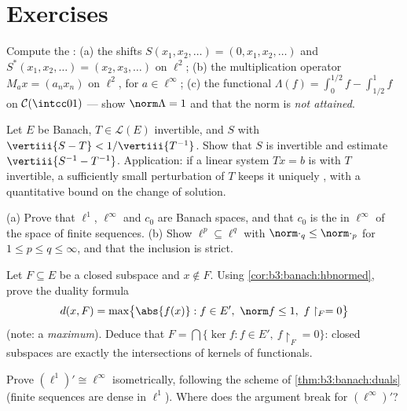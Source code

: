 \section{Exercises}

\begin{exercise}[$\star$]\label{exo:b3:banach:1}
Compute the :
(a) the shifts $S(x_1, x_2, \dots) = (0, x_1, x_2, \dots)$ and
$S^*(x_1, x_2, \dots) = (x_2, x_3, \dots)$ on $\ell^2$;
(b) the multiplication operator $M_a x = (a_nx_n)$ on $\ell^2$,
for $a \in \ell^\infty$;
(c) the functional $\Lambda(f) = \int_0^{1/2}f -
\int_{1/2}^1f$ on $\mathcal C(\intcc01)$ --- show
$\norm\Lambda = 1$ and that the norm is \emph{not attained}.
\end{exercise}

\begin{exercise}[$\star$]\label{exo:b3:banach:2}
Let $E$ be Banach, $T \in \mathcal L(E)$ invertible, and $S$
with $\vertiii{S - T} < 1/\vertiii{T^{-1}}$. Show that $S$ is
invertible and estimate $\vertiii{S^{-1} - T^{-1}}$. Application:
if a linear system $Tx = b$ is  with $T$ invertible, a
sufficiently small perturbation of $T$ keeps it uniquely
, with a quantitative bound on the change of solution.
\end{exercise}

\begin{exercise}[$\star\star$]\label{exo:b3:banach:3}
(a) Prove that $\ell^1$, $\ell^\infty$ and $c_0$ are Banach
spaces, and that $c_0$ is the  in $\ell^\infty$ of the
space of finite sequences.
(b) Show $\ell^p \subseteq \ell^q$ with $\norm\cdot_q \leq
\norm\cdot_p$ for $1 \leq p \leq q \leq \infty$, and that the
inclusion is strict.
\end{exercise}

\begin{exercise}[$\star\star$]\label{exo:b3:banach:4}
Let $F \subseteq E$ be a closed subspace and $x \notin F$.
Using \cref{cor:b3:banach:hbnormed}, prove the duality formula
\[
d(x, F) = \max\bigl\{\abs{f(x)} : f \in E',\ \norm f \leq 1,\
f\restriction_F = 0\bigr\}
\]
(note: a \emph{maximum}). Deduce that $F = \bigcap\{\ker f : f
\in E',\ f\restriction_F = 0\}$: closed subspaces are exactly
the intersections of kernels of functionals.
\end{exercise}

\begin{exercise}[$\star\star$]\label{exo:b3:banach:5}
Prove $(\ell^1)' \cong \ell^\infty$ isometrically, following the
scheme of \cref{thm:b3:banach:duals} (finite sequences are dense
in $\ell^1$).
Where does the argument break for $(\ell^\infty)'$?
\end{exercise}

